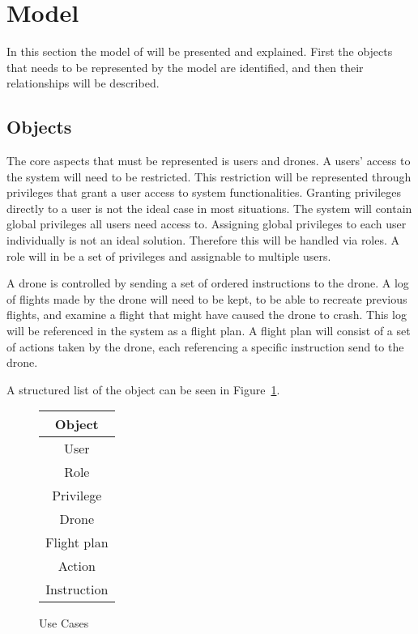 \section{Model}
In this section the model of \projectname{} will be presented and explained.
First the objects that needs to be represented by the model are identified, and then their relationships will be described.

\subsection{Objects}
\label{subsec:objects}
The core aspects that must be represented is users and drones.
A users' access to the system will need to be restricted.
This restriction will be represented through privileges that grant a user access to system functionalities.
Granting privileges directly to a user is not the ideal case in most situations.
The system will contain global privileges all users need access to.
Assigning global privileges to each user individually is not an ideal solution.
Therefore this will be handled via roles.
A role will in \projectname{} be a set of privileges and assignable to multiple users.

A drone is controlled by sending a set of ordered instructions to the drone.
A log of flights made by the drone will need to be kept, to be able to recreate previous flights, and examine a flight that might have caused the drone to crash.
This log will be referenced in the system as a flight plan.
A flight plan will consist of a set of actions taken by the drone, each referencing a specific instruction send to the drone.

A structured list of the object can be seen in Figure~\ref{tab:model_objects}.

\begin{figure}[H]
\begin{center}
\begin{tabular}{ |c| }
  \hline              
	\textbf{Object}\\ \hline
	User \\ \hline
	Role \\ \hline
	Privilege \\ \hline
	Drone \\ \hline
	Flight plan \\ \hline
	Action \\ \hline
	Instruction\\ \hline  
\end{tabular}

\caption{Use Cases}
\label{tab:model_objects}
\end{center}
\end{figure}


